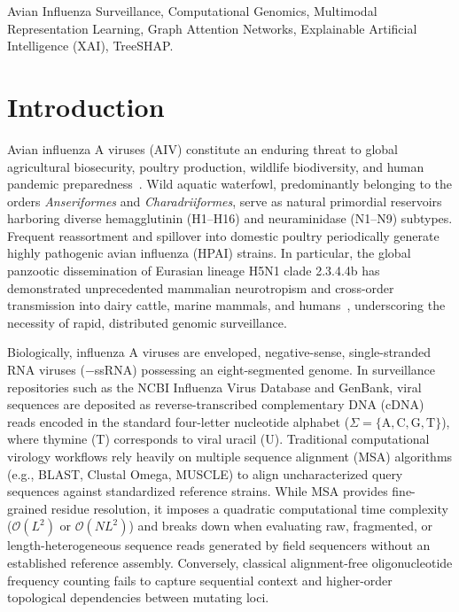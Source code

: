 \documentclass[conference]{IEEEtran}
\begin{document}
\begin{IEEEkeywords}
Avian Influenza Surveillance, Computational Genomics, Multimodal Representation Learning, Graph Attention Networks, Explainable Artificial Intelligence (XAI), TreeSHAP.
\end{IEEEkeywords}

\section{Introduction}
\label{sec:introduction}

Avian influenza A viruses (AIV) constitute an enduring threat to global agricultural biosecurity, poultry production, wildlife biodiversity, and human pandemic preparedness~\cite{webster1992}. Wild aquatic waterfowl, predominantly belonging to the orders \textit{Anseriformes} and \textit{Charadriiformes}, serve as natural primordial reservoirs harboring diverse hemagglutinin (H1--H16) and neuraminidase (N1--N9) subtypes. Frequent reassortment and spillover into domestic poultry periodically generate highly pathogenic avian influenza (HPAI) strains. In particular, the global panzootic dissemination of Eurasian lineage H5N1 clade 2.3.4.4b has demonstrated unprecedented mammalian neurotropism and cross-order transmission into dairy cattle, marine mammals, and humans~\cite{dejong2006}, underscoring the necessity of rapid, distributed genomic surveillance.

Biologically, influenza A viruses are enveloped, negative-sense, single-stranded RNA viruses ($-$ssRNA) possessing an eight-segmented genome. In surveillance repositories such as the NCBI Influenza Virus Database and GenBank, viral sequences are deposited as reverse-transcribed complementary DNA (cDNA) reads encoded in the standard four-letter nucleotide alphabet ($\Sigma = \{\text{A}, \text{C}, \text{G}, \text{T}\}$), where thymine (T) corresponds to viral uracil (U). Traditional computational virology workflows rely heavily on multiple sequence alignment (MSA) algorithms (e.g., BLAST, Clustal Omega, MUSCLE) to align uncharacterized query sequences against standardized reference strains. While MSA provides fine-grained residue resolution, it imposes a quadratic computational time complexity ($\mathcal{O}(L^2)$ or $\mathcal{O}(N L^2)$) and breaks down when evaluating raw, fragmented, or length-heterogeneous sequence reads generated by field sequencers without an established reference assembly. Conversely, classical alignment-free oligonucleotide frequency counting fails to capture sequential context and higher-order topological dependencies between mutating loci.
\end{document}
